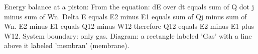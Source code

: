 Energy balance at a piston:  
From the equation: dE over dt equals sum of Q dot j minus sum of Wn.  
Delta E equals E2 minus E1 equals sum of Qj minus sum of Wn.  
E2 minus E1 equals Q12 minus W12 therefore Q12 equals E2 minus E1 plus W12.  
System boundary: only gas.  
Diagram: a rectangle labeled 'Gas' with a line above it labeled 'membran' (membrane).